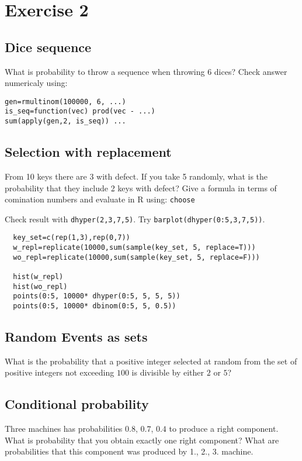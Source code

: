 \documentclass[4pt]{article}
\def\result#1{}
\def\answer#1{}
\begin{document}
\pagebreak
\section{Exercise 2}
%
% 

\subsection{Dice sequence}
What is probability to throw a sequence when throwing 6 dices? \result{$0.0154$}
Check answer numericaly using: 
\begin{verbatim}
gen=rmultinom(100000, 6, ...)
is_seq=function(vec) prod(vec - ...)
sum(apply(gen,2, is_seq)) ...
\end{verbatim}


\subsection{Selection with replacement}
   From 10 keys there are 3 with defect. If you take 5 randomly, what is the 
   probability that they include 2 keys with defect? \result{$0.41666$} Give a formula in terms of comination numbers and evaluate in R
   using: \verb'choose'

   Check result with \verb'dhyper(2,3,7,5)'. Try \verb'barplot(dhyper(0:5,3,7,5))'.

\begin{verbatim}  
  key_set=c(rep(1,3),rep(0,7))
  w_repl=replicate(10000,sum(sample(key_set, 5, replace=T)))
  wo_repl=replicate(10000,sum(sample(key_set, 5, replace=F)))
  
  hist(w_repl)
  hist(wo_repl)
  points(0:5, 10000* dhyper(0:5, 5, 5, 5))
  points(0:5, 10000* dbinom(0:5, 5, 0.5))
\end{verbatim}

\subsection{Random Events as sets}
What is the probability that a positive integer selected at random from
the set of positive integers not exceeding $100$ is divisible by either $2$ or $5$?

\answer{
\[
 P(A \vee B) = P(A) + P(B) - P(A.B) = 0.5 + 0.2 - 0.1 = 0.6 
\]
}



\subsection{Conditional probability}
Three machines has probabilities $0.8$, $0.7$, $0.4$ to produce a right component. 
What is probability that you obtain exactly one right component? What are probabilities
that this component was produced by 1., 2., 3. machine. 
\answer{
\[
    P(A)=P(A_1'A_2A_3 + A_1 A_2'A_3 + A_1A_2 A_3')
\]
]
}
\result{
\[
        P(A) = 0.252,\quad 
        P(A1/A) = 0.571\quad
        P(A2/A) = 0.333\quad
        P(A3/A) = 0.095
\]        
}
\end{document}
